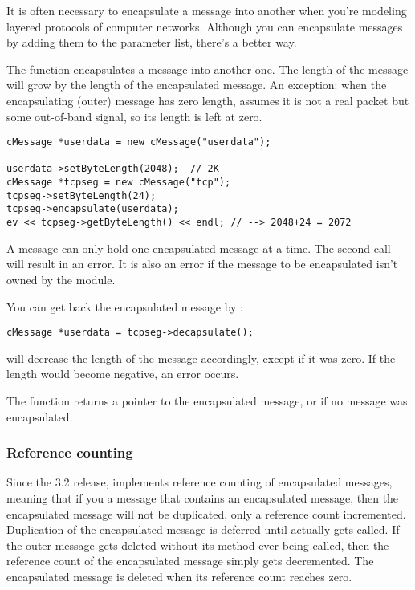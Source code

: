 It is often necessary to encapsulate a
message into another when you're modeling
layered protocols of computer networks. Although you can encapsulate
messages by adding them to the parameter list, there's a better way.


The  function encapsulates a message
into another one. The length of the message will grow by the length of
the encapsulated message. An exception: when the encapsulating (outer)
message has zero length, {\opp} assumes it is not a real packet but
some out-of-band signal, so its length is left at zero.

\begin{verbatim}
cMessage *userdata = new cMessage("userdata");

userdata->setByteLength(2048);  // 2K
cMessage *tcpseg = new cMessage("tcp");
tcpseg->setByteLength(24);
tcpseg->encapsulate(userdata);
ev << tcpseg->getByteLength() << endl; // --> 2048+24 = 2072
\end{verbatim}

A message can only hold one encapsulated message at a time. The
second  call will result in an error. It is also
an error if the message to be encapsulated isn't owned by the
module.

You can get back the encapsulated message by :

\begin{verbatim}
cMessage *userdata = tcpseg->decapsulate();
\end{verbatim}

 will decrease the length of the message accordingly,
except if it was zero. If the length would become negative, an
error occurs.

The  function returns a pointer to the encapsulated
message, or  if no message was encapsulated.

\subsubsection{Reference counting}

Since the 3.2 release, {\opp} implements reference counting of
encapsulated messages, meaning that if you  a message
that contains an encapsulated message, then the encapsulated message will
not be duplicated, only a reference count incremented. Duplication of
the encapsulated message is deferred until 
actually gets called. If the outer message gets deleted without its
 method ever being called, then the reference
count of the encapsulated message simply gets decremented. The
encapsulated message is deleted when its reference count reaches
zero.

